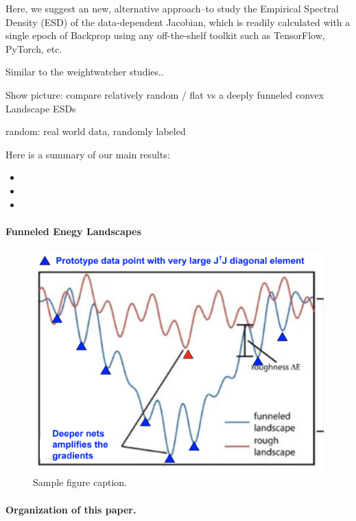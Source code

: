Here, we suggest an new, alternative approach--to study the Empirical Spectral Density (ESD)
of the data-dependent Jacobian, which is readily calculated with a single epoch of Backprop
using any off-the-shelf toolkit such as TensorFlow, PyTorch, etc. 

Similar to the weightwatcher studies..

Show picture:  compare relatively random / flat vs  a deeply funneled convex Landscape ESDs

random:  real world data, randomly labeled 




Here is a summary of our main results:
\begin{itemize}
\item

\item

\item 

\end{itemize}


\paragraph{Funneled Enegy Landscapes}
\begin{figure}[h]
\begin{center}
\includegraphics[scale=0.2]{img/funnel.png}
\end{center}
\caption{Sample figure caption.}
\label{fig:funnel}
\end{figure}




\paragraph{Organization of this paper.}



